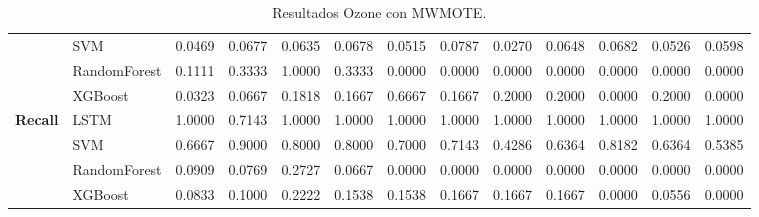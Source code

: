 \begin{table}[h]
\begin{adjustbox}{max width=15cm}
\begin{tabular}{|c|l|r|r|r|r|r|r|r|r|r|r|r|}
			& SVM &  0.0469 &  0.0677 &  0.0635 &  0.0678 &  0.0515 &  0.0787 &  0.0270 &  0.0648 &  0.0682 &  0.0526 &  0.0598 \\
			& RandomForest &  0.1111 &  0.3333 &  1.0000 &  0.3333 &  0.0000 &  0.0000 &  0.0000 &  0.0000 &  0.0000 &  0.0000 &  0.0000 \\
			& XGBoost &  0.0323 &  0.0667 &  0.1818 &  0.1667 &  0.6667 &  0.1667 &  0.2000 &  0.2000 &  0.0000 &  0.2000 &  0.0000 \\
			\hline
			\textbf{Recall} & LSTM &  1.0000 &  0.7143 &  1.0000 &  1.0000 &  1.0000 &  1.0000 &  1.0000 &  1.0000 &  1.0000 &  1.0000 &  1.0000 \\
			& SVM &  0.6667 &  0.9000 &  0.8000 &  0.8000 &  0.7000 &  0.7143 &  0.4286 &  0.6364 &  0.8182 &  0.6364 &  0.5385 \\
			& RandomForest &  0.0909 &  0.0769 &  0.2727 &  0.0667 &  0.0000 &  0.0000 &  0.0000 &  0.0000 &  0.0000 &  0.0000 &  0.0000 \\
			& XGBoost &  0.0833 &  0.1000 &  0.2222 &  0.1538 &  0.1538 &  0.1667 &  0.1667 &  0.1667 &  0.0000 &  0.0556 &  0.0000 \\
			\hline
		\end{tabular}
	\end{adjustbox}
	\caption{Resultados Ozone con MWMOTE.}
	\label{tab:Ozone_MWMOTE}
\end{table}

